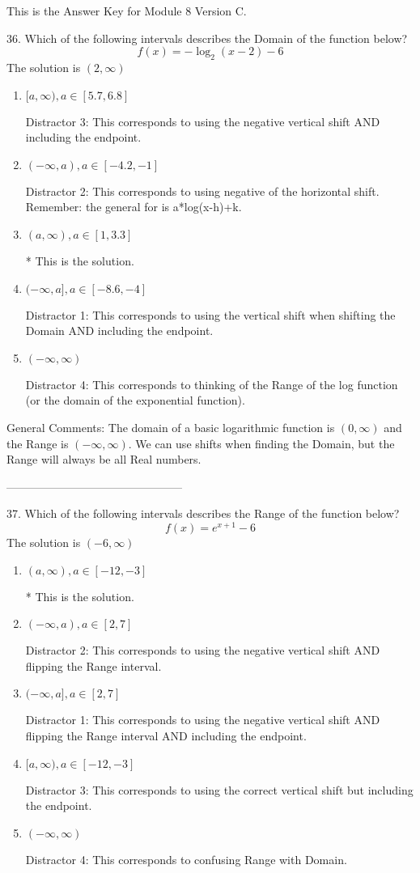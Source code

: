 \documentclass{article}[10pt]
\begin{document}
This is the Answer Key for Module 8 Version C.

36. Which of the following intervals describes the Domain of the function below?
$$ f(x) = -\log_2{(x-2)}-6 $$ 
The solution is $ (2, \infty) $ 

\begin{enumerate}[label=\Alph*.] 
\item $ [a, \infty), a \in [5.7, 6.8] $ 

  Distractor 3: This corresponds to using the negative vertical shift AND including the endpoint. 
\item $ (-\infty, a), a \in [-4.2, -1] $ 

  Distractor 2: This corresponds to using negative of the horizontal shift. Remember: the general for is a*log(x-h)+k. 
\item $ (a, \infty), a \in [1, 3.3] $ 

 * This is the solution. 
\item $ (-\infty, a], a \in [-8.6, -4] $ 

  Distractor 1: This corresponds to using the vertical shift when shifting the Domain AND including the endpoint. 
\item $ (-\infty, \infty) $ 

 Distractor 4: This corresponds to thinking of the Range of the log function (or the domain of the exponential function). 
\end{enumerate} 
 
General Comments: The domain of a basic logarithmic function is $(0, \infty)$ and the Range is $(-\infty, \infty)$. We can use shifts when finding the Domain, but the Range will always be all Real numbers.

-----------------------------------------------

37. Which of the following intervals describes the Range of the function below?
$$ f(x) = e^{x+1}-6 $$ 
The solution is $ (-6, \infty) $ 

\begin{enumerate}[label=\Alph*.] 
\item $ (a, \infty), a \in [-12, -3] $ 

 * This is the solution. 
\item $ (-\infty, a), a \in [2, 7] $ 

  Distractor 2: This corresponds to using the negative vertical shift AND flipping the Range interval. 
\item $ (-\infty, a], a \in [2, 7] $ 

  Distractor 1: This corresponds to using the negative vertical shift AND flipping the Range interval AND including the endpoint. 
\item $ [a, \infty), a \in [-12, -3] $ 

  Distractor 3: This corresponds to using the correct vertical shift but including the endpoint. 
\item $ (-\infty, \infty) $ 

 Distractor 4: This corresponds to confusing Range with Domain. 
\end{enumerate} 
 
\end{document}

